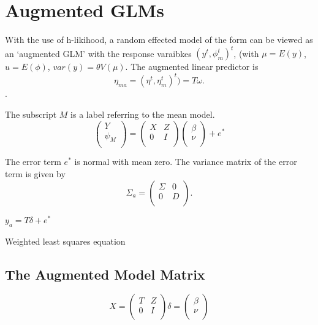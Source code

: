 \documentclass[12pt, a4paper]{report}
\theoremstyle{plain}
\theoremstyle{definition}
\theoremstyle{remark}
\begin{document}
	
	


\section{Augmented GLMs} %

With the use of h-likihood, a random effected model of the form can be viewed as an `augmented GLM' with the response varaibkes $(y^t, \phi^t_m)^t$, (with $\mu = E(y)$,$ u = E(\phi)$, $var(y) = \theta V (\mu)$.
The augmented linear predictor is \[\eta_{ma}  = (\eta^t, \eta^t_m)^t) = T\omega. \].




The subscript $M$ is a label referring to the mean model.
\begin{equation}
\left(%
\begin{array}{c}
Y \\
\psi_{M} \\
\end{array}%
\right) = \left(
\begin{array}{cc}
X & Z \\
0 & I \\
\end{array}\right) \left(%
\begin{array}{c}
\beta \\
\nu \\
\end{array}%
\right)+ e^{*}
\end{equation}




The error term $e^{*}$ is normal with mean zero. The variance matrix of the error term is given by
\begin{equation}
\Sigma_{a} = \left(%
\begin{array}{cc}
\Sigma & 0 \\
0 & D \\
\end{array}%
\right).
\end{equation}

$y_{a} = T \delta + e^{*}$

Weighted least squares equation




\subsection{The Augmented Model Matrix}  %
\begin{equation}
X = \left(%
\begin{array}{cc}
T & Z \\
0 & I \\
\end{array}%
\right)
\delta = \left(%
\begin{array}{c}
\beta  \\
\nu  \\
\end{array}%
\right)
\end{equation}
\end{document}
